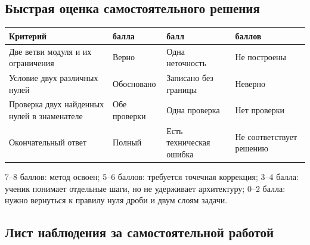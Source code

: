 \subsection{Быстрая оценка самостоятельного решения}

\begin{center}
  \renewcommand{\arraystretch}{1.42}
  \begin{tabularx}{\textwidth}{
    >{\raggedright\arraybackslash}p{}
    >{\centering\arraybackslash}p{}
    >{\centering\arraybackslash}p{}
    >{\centering\arraybackslash}X}
    \toprule
    \rowcolor{TableHeader}
    Критерий & 2 балла & 1 балл & 0 баллов \\
    \midrule
    Две ветви модуля и их ограничения
      & Верно & Одна неточность & Не построены \\
    \addlinespace[0.2em]
    Условие двух различных нулей
      & Обосновано & Записано без границы & Неверно \\
    \addlinespace[0.2em]
    Проверка двух найденных нулей в знаменателе
      & Обе проверки & Одна проверка & Нет проверки \\
    \addlinespace[0.2em]
    Окончательный ответ
      & Полный & Есть техническая ошибка & Не соответствует решению \\
    \bottomrule
  \end{tabularx}
\end{center}

\begin{teacherbox}[Интерпретация]
  7--8 баллов: метод освоен; 5--6 баллов: требуется точечная коррекция;
  3--4 балла: ученик понимает отдельные шаги, но не удерживает архитектуру;
  0--2 балла: нужно вернуться к правилу нуля дроби и двум слоям задачи.
\end{teacherbox}

\subsection{Лист наблюдения за самостоятельной работой}

